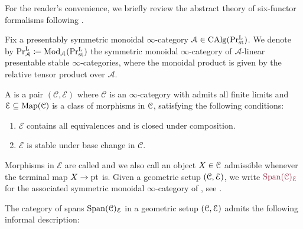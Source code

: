 For the reader's convenience, we briefly review the abstract theory of six-functor formalisms following \cite{Liu_Zheng2012, Mann2022, Scholze2025, Cnossen_Lenz_Linskens2026}.

Fix a presentably symmetric monoidal $\infty$-category $\mathcal A \in \operatorname{CAlg}(\operatorname{Pr^L_{st}})$. We denote by $\mathrm{Pr}^{\mathrm{L}}_{\mathcal A} \coloneq \operatorname{Mod}_{\mathcal A}(\operatorname{Pr^L_{st}})$ the symmetric monoidal $\infty$-category of $\mathcal A$-linear presentable stable $\infty$-categories, where the monoidal product is given by the relative tensor product over $\mathcal A$. 

\begin{defn}\label{defn: geometric setup}
A  is a pair $(\mathcal C, \mathcal E)$ where $\mathcal C$ is an $\infty$-category with admits all finite limits
and $\mathcal E \subseteq \operatorname{Map} (\mathcal C)$ is a class of morphisms
in $\mathcal{C}$, satisfying the following conditions:
\begin{enumerate}[label=(\roman*)]
    \item $\mathcal E$ contains all equivalences and is closed under composition.
    \item $\mathcal E$ is stable under base change in $\mathcal C$.
\end{enumerate}
Morphisms in $\mathcal E$ are called  and we also call
an object $X\in \mathcal{C}$ admissible whenever the terminal map $X\to \mathrm{pt}$ is.
Given a geometric setup $(\mathcal{C},\mathcal{E})$, we write $\mdef{\Span{\cC}_{\cE}}$ for the associated
symmetric monoidal $\infty$-category of , see . 
\end{defn}
The category of spans $\operatorname{\mathrm{Span}}({\mathcal{C}})_{\mathcal{E}}$ in a geometric
setup $(\mathcal{C},\mathcal{E})$ admits the following informal description:
